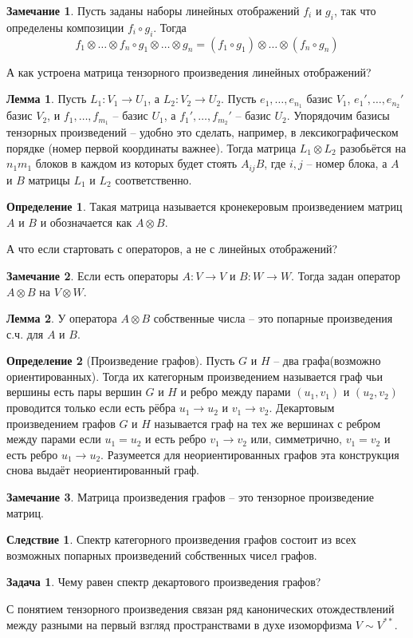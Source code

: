 \documentclass[10pt,a4paper,oneside]{book}
\theoremstyle{definition}
\newtheorem*{rem}{Замечание}
\newtheorem{zad}{Задача}
\newtheorem*{defn}{{\color{yellow!20!red} Определение}}
\newtheorem{lem}{Лемма}
\newtheorem{cor}{Следствие}
\def\dfn{\begin{defn}}
\def\edfn{\end{defn}}
\def\lm{\begin{lem}}
\def\elm{\end{lem}}
\def\zd{\begin{zad}}
\def\ezd{\end{zad}}
\def\crl{\begin{cor}}
\def\ecrl{\end{cor}}
\def\rm{\begin{rem}}
\def\erm{\end{rem}}
\begin{document}
\rm Пусть заданы наборы линейных отображений $f_i$ и $g_i$, так что определены композиции $f_i\circ g_i$. Тогда $$f_1\otimes \dots \otimes f_n \circ g_1\otimes \dots \otimes g_n=(f_1\circ g_1)\otimes \dots \otimes (f_n\circ g_n)$$
\erm 

А как устроена матрица тензорного произведения линейных отображений?


\lm Пусть $L_1 \colon V_1 \to U_1$, а $L_2 \colon V_2 \to U_2$. Пусть $e_1,\dots, e_{n_1}$ базис $V_1$,  $e_1',\dots, e_{n_2}'$ базис $V_2$,  и $f_1,\dots, f_{m_1}$ -- базис $U_1$, а $f_1',\dots, f_{m_2}'$ -- базис $U_2$. 
Упорядочим базисы тензорных произведений -- удобно это сделать, например, в лексикографическом порядке (номер первой координаты важнее).
Тогда матрица  $L_1\otimes L_2$  разобьётся на $n_1m_1$ блоков в каждом из которых будет стоять $ A_{ij} B$, где $i,j$ -- номер блока, а $A$ и $B$ матрицы $L_1$ и $L_2$ соответственно.
\elm

\dfn Такая матрица называется кронекеровым произведением матриц $A$ и $B$ и обозначается как $A\otimes B$.
\edfn

А что если стартовать с операторов, а не с линейных отображений?

\rm Если есть операторы $A\colon V \to V$ и $B \colon W \to W$. Тогда задан оператор $A\otimes B$ на $V\otimes W$. \erm

\lm У оператора $A\otimes B$ собственные числа -- это попарные произведения с.ч. для $A$ и $B$. 
\elm


 

\dfn[Произведение графов] Пусть $G$ и $H$ -- два графа(возможно ориентированных). Тогда их категорным произведением называется граф чьи вершины есть пары вершин $G$ и $H$ и ребро между парами $(u_1,v_1)$ и $(u_2,v_2)$ проводится только если есть рёбра $u_1 \to u_2$ и $v_1 \to v_2$. Декартовым произведением графов $G$ и $H$ называется граф на тех же вершинах с ребром между парами если $u_1=u_2$ и есть ребро $v_1\to v_2$ или, симметрично, $v_1=v_2$ и есть ребро $u_1 \to u_2$. Разумеется для неориентированных графов эта конструкция снова выдаёт неориентированный граф.
\edfn

\rm Матрица произведения графов -- это тензорное произведение матриц.
\erm

\crl Спектр категорного произведения графов состоит из всех возможных попарных произведений собственных чисел графов.
\ecrl

\zd Чему равен спектр декартового произведения графов?
\ezd


С понятием тензорного произведения связан ряд канонических отождествлений между разными на первый взгляд пространствами в духе изоморфизма $V \sim V^{**}$.
\end{document}
